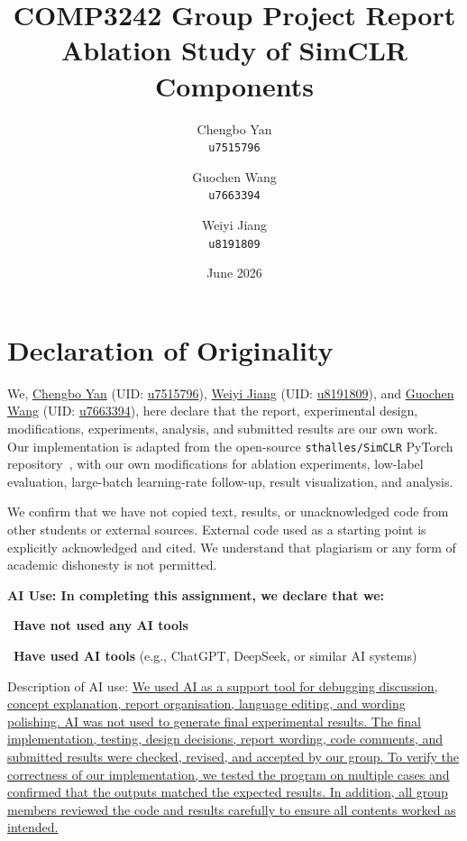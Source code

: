 \documentclass[10pt]{article}
\title{COMP3242 Group Project Report\\Ablation Study of SimCLR Components}
\author{
Chengbo Yan \\ \texttt{u7515796}
\and
Guochen Wang \\ \texttt{u7663394}
\and
Weiyi Jiang \\ \texttt{u8191809}
}
\date{June 2026}
\begin{document}
\maketitle

\section*{Declaration of Originality}

We, \underline{Chengbo Yan} (UID: \underline{u7515796}), \underline{Weiyi Jiang} (UID: \underline{u8191809}), and \underline{Guochen Wang} (UID: \underline{u7663394}), here declare that the report, experimental design, modifications, experiments, analysis, and submitted results are our own work. Our implementation is adapted from the open-source \texttt{sthalles/SimCLR} PyTorch repository~\cite{sthalles_simclr}, with our own modifications for ablation experiments, low-label evaluation, large-batch learning-rate follow-up, result visualization, and analysis.

\vspace{0.8em}

We confirm that we have not copied text, results, or unacknowledged code from other students or external sources. External code used as a starting point is explicitly acknowledged and cited. We understand that plagiarism or any form of academic dishonesty is not permitted.

\vspace{0.8em}

\textbf{AI Use: In completing this assignment, we declare that we:}

\fbox{\rule{0pt}{1.1ex}\rule{1.1ex}{0pt}}~\textbf{Have not used any AI tools}

~\textbf{Have used AI tools} (e.g., ChatGPT, DeepSeek, or similar AI systems)

\vspace{0.8em}

Description of AI use: \uline{We used AI as a support tool for debugging discussion, concept explanation, report organisation, language editing, and wording polishing. AI was not used to generate final experimental results. The final implementation, testing, design decisions, report wording, code comments, and submitted results were checked, revised, and accepted by our group. To verify the correctness of our implementation, we tested the program on multiple cases and confirmed that the outputs matched the expected results. In addition, all group members reviewed the code and results carefully to ensure all contents worked as intended.}
\end{document}
